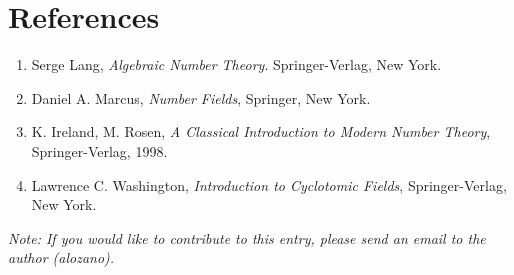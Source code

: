 \documentclass[12pt]{article}
\begin{document}
\section*{References}
\begin{enumerate}
\item Serge Lang, {\em Algebraic Number Theory}. Springer-Verlag, New York.
\item Daniel A. Marcus, {\em Number Fields}, Springer, New York.
\item K. Ireland, M. Rosen, {\em A Classical Introduction to Modern Number Theory}, Springer-Verlag, 1998.
\item Lawrence C. Washington, {\em Introduction to Cyclotomic Fields}, Springer-Verlag, New York.
\end{enumerate}
{\it Note: If you would like to contribute to this entry, please send an email to the author (alozano).}
\end{document}
